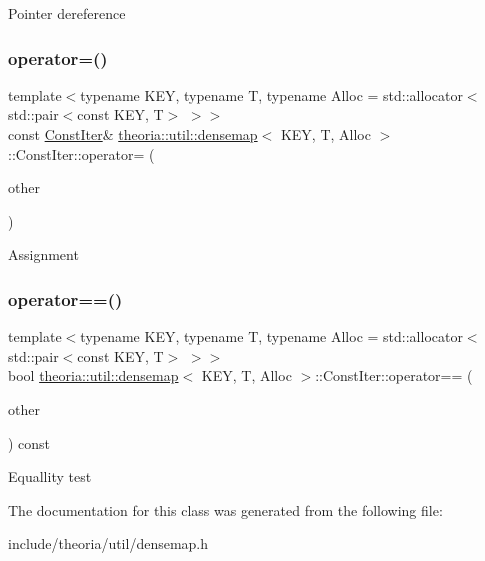 Pointer dereference \mbox{\label{classtheoria_1_1util_1_1densemap_1_1ConstIter_a8c7a0c2774a2d4cb22aa82f83585dd27}} 
\subsubsection{\texorpdfstring{operator=()}{operator=()}}
{\footnotesize\ttfamily template$<$typename K\+EY, typename T, typename Alloc = std\+::allocator$<$std\+::pair$<$const K\+E\+Y, T$>$ $>$$>$ \\
const \hyperlink{classtheoria_1_1util_1_1densemap_1_1ConstIter}{Const\+Iter}\& \hyperlink{classtheoria_1_1util_1_1densemap}{theoria\+::util\+::densemap}$<$ K\+EY, T, Alloc $>$\+::Const\+Iter\+::operator= (\begin{DoxyParamCaption}\item[{const \hyperlink{classtheoria_1_1util_1_1densemap_1_1ConstIter}{Const\+Iter} \&}]{other }\end{DoxyParamCaption})\hspace{0.3cm}{\ttfamily [inline]}}

Assignment \mbox{\label{classtheoria_1_1util_1_1densemap_1_1ConstIter_a4fb1efa9f5b9594d3e05a00a04f4e774}} 
\subsubsection{\texorpdfstring{operator==()}{operator==()}}
{\footnotesize\ttfamily template$<$typename K\+EY, typename T, typename Alloc = std\+::allocator$<$std\+::pair$<$const K\+E\+Y, T$>$ $>$$>$ \\
bool \hyperlink{classtheoria_1_1util_1_1densemap}{theoria\+::util\+::densemap}$<$ K\+EY, T, Alloc $>$\+::Const\+Iter\+::operator== (\begin{DoxyParamCaption}\item[{const \hyperlink{classtheoria_1_1util_1_1densemap_1_1ConstIter}{Const\+Iter} \&}]{other }\end{DoxyParamCaption}) const\hspace{0.3cm}{\ttfamily [inline]}}

Equallity test 

The documentation for this class was generated from the following file\+:\begin{DoxyCompactItemize}
\item 
include/theoria/util/densemap.\+h\end{DoxyCompactItemize}
